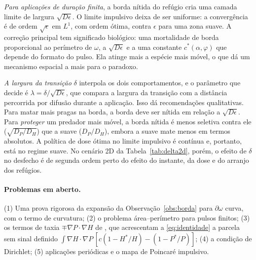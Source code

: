 \documentclass[11pt,a4paper]{article}
\numberwithin{equation}{section}
\theoremstyle{definition}
\theoremstyle{remark}
\newcommand{\Hs}{H^{*}}
\newcommand{\Ps}{P^{*}}
\begin{document}
\emph{Para aplicações de duração finita}, a borda nítida do refúgio cria uma camada limite de
largura $\sqrt{D\epsilon}$. O limite impulsivo deixa de ser uniforme: a convergência é de ordem
$\sqrt\epsilon$ em $L^1$, com ordem ótima, contra $\epsilon$ para uma zona suave. A correção principal
tem significado biológico: uma mortalidade de borda proporcional ao perímetro de $\omega$, a
$\sqrt{D\epsilon}$ e a uma constante $c^*(\alpha,\varphi)$ que depende do formato do pulso. Ela atinge
mais a espécie mais móvel, o que dá um mecanismo espacial a mais para o paradoxo.

\emph{A largura da transição} $\delta$ interpola os dois comportamentos, e o parâmetro que decide é
$\lambda=\delta/\sqrt{D\epsilon}$, que compara a largura da transição com a distância percorrida por difusão
durante a aplicação. Isso dá recomendações qualitativas. Para matar mais pragas na borda, a borda deve
ser nítida em relação a $\sqrt{D\epsilon}$. Para \emph{proteger} um predador mais móvel, a borda nítida é
menos seletiva contra ele ($\sqrt{D_P/D_H}$) que a suave ($D_P/D_H$), embora a suave mate menos em termos
absolutos. A política de dose ótima no limite impulsivo é contínua e, portanto, está no regime suave.
No cenário 2D da Tabela~\ref{tab:delta2d}, porém, o efeito de $\delta$ no desfecho é de segunda ordem
perto do efeito do instante, da dose e do arranjo dos refúgios.

\paragraph{Problemas em aberto.} (1) Uma prova rigorosa da expansão da Observação~\ref{obs:borda}
para $\partial\omega$ curva, com o termo de curvatura; (2) o problema área--perímetro para
pulsos finitos; (3) os termos de taxia $\mp\nabla P\cdot\nabla H$ de \cite{LiYang}, que acrescentam a
\eqref{eq:identidade} a parcela sem sinal definido
$\int\nabla H\cdot\nabla P\,[c(1-\Hs/H)-(1-\Ps/P)]$; (4) a condição de Dirichlet; (5) aplicações
periódicas e o mapa de Poincaré impulsivo.
\end{document}

